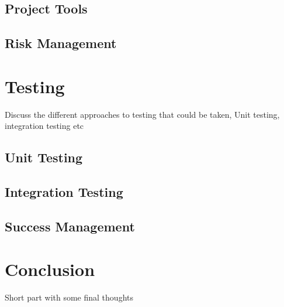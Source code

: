 \documentclass{report}
\begin{document}
\section{Project Tools}

\section{Risk Management}

\chapter{Testing}

Discuss the different approaches to testing that could be taken, Unit testing, integration testing etc

\section{Unit Testing}

\section{Integration Testing}

\section{Success Management}

\chapter{Conclusion}

Short part with some final thoughts


{}

\end{document}

